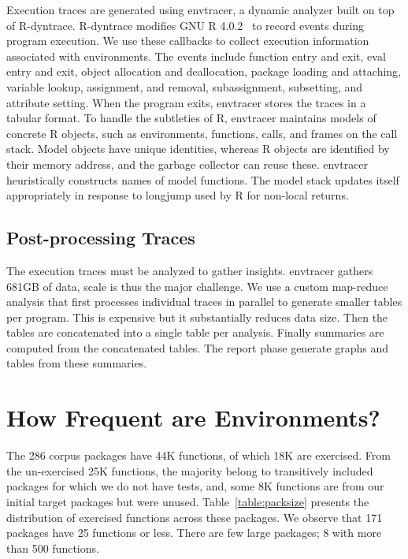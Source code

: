 \documentclass[10pt,sigplan,authorversion=true]{acmart}
\newcommand{\envtracer}{{\sf envtracer}\xspace}
\newcommand{\rdyntrace}{{\sf R-dyntrace}\xspace}
\begin{document}
Execution traces are generated using \envtracer, a dynamic analyzer built on top
of \rdyntrace. \rdyntrace modifies GNU R 4.0.2~\cite{oopsla19b} to record events
during program execution. We use these callbacks to collect execution
information associated with environments. The events include function entry and
exit, eval entry and exit, object allocation and deallocation, package loading
and attaching, variable lookup, assignment, and removal, subassignment,
subsetting, and attribute setting. When the program exits, \envtracer stores the
traces in a tabular format. To handle the subtleties of R, \envtracer maintains
models of concrete R objects, such as environments, functions, calls, and frames
on the call stack. Model objects have unique identities, whereas R objects are
identified by their memory address, and the garbage collector can reuse these.
\envtracer heuristically constructs names of model functions. The model stack
updates itself appropriately in response to longjump used by R for non-local
returns.

\subsection{Post-processing Traces}

The execution traces must be analyzed to gather insights. \envtracer gathers
681GB of data, scale is thus the major challenge. We use a custom map-reduce
analysis that first processes individual traces in parallel to generate smaller
tables per program. This is expensive but it substantially reduces data size.
Then the tables are concatenated into a single table per analysis. Finally
summaries are computed from the concatenated tables. The report phase generate
graphs and tables from these summaries.

\section{How Frequent are Environments?}

The 286 corpus packages have 44K functions, of which 18K are exercised. From the
un-exercised 25K functions, the majority belong to transitively included
packages for which we do not have tests, and, some 8K functions are from our
initial target packages but were unused. Table~\ref{table:packsize} presents the
distribution of exercised functions across these packages. We observe that 171
packages have 25 functions or less. There are few large packages; 8 with more
than 500 functions.
\end{document}
